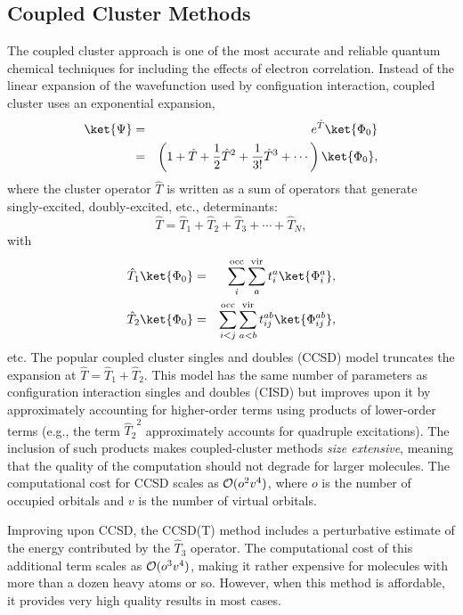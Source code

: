 \subsection{Coupled Cluster Methods} \label{sec:cc}
\renewcommand{\optionname}[2]{\texttt{\nameref{op-#2-#1}}}

The coupled cluster approach is one of the most accurate and reliable quantum
chemical techniques for including the effects of electron correlation.
Instead of the linear expansion of the wavefunction used by configuation
interaction, coupled cluster uses an exponential expansion,
\begin{eqnarray}
\ket{\Psi} &=& e^{\hat{T}} \ket{\Phi_0} \\ \nonumber
           &=& \left( 1 + {\hat{T}} + \frac{1}{2} {\hat{T}}^2
                  + \frac{1}{3!}{\hat{T}}^3 + \cdots \right) \ket{\Phi_0},
\label{eq:CCexpansion}
\end{eqnarray}
where the cluster operator ${\hat{T}}$ is written as a sum of operators that
generate singly-excited, doubly-excited, etc., determinants:
\begin{equation}
{\hat{T}} = {\hat{T}_1} + {\hat{T}_2} + {\hat{T}_3} + \cdots + {\hat{T}_N},
\end{equation}
with
\begin{eqnarray}
{\hat T}_1 \ket{\Phi_0} &=& \sum_{i}^{\rm occ} 
  \sum_a^{\rm vir} t_i^a \ket{\Phi_i^a}, \\
{\hat T}_2 \ket{\Phi_0} &=& \sum_{i<j}^{\rm occ} \sum_{a<b}^{\rm vir} 
  t_{ij}^{ab} \ket{\Phi_{ij}^{ab}}, 
\end{eqnarray}
etc.  The popular coupled cluster singles and doubles (CCSD) model
\cite{Purvis:1982} truncates the expansion at ${\hat{T}} = {\hat{T}_1}
+ {\hat{T}_2}$.  This model has the same number of parameters as
configuration interaction singles and doubles (CISD) but improves upon
it by approximately accounting for higher-order terms using products
of lower-order terms (e.g., the term ${\hat{T}_2}^2$ approximately
accounts for quadruple excitations).  The inclusion of such products
makes coupled-cluster methods {\em size extensive}, meaning that the
quality of the computation should not degrade for larger molecules.
The computational cost for CCSD scales as ${\cal{O}}(o^2 v^4)$, where
$o$ is the number of occupied orbitals and $v$ is the number of virtual
orbitals.

Improving upon CCSD, the CCSD(T) method \cite{Raghavachari:1989} includes
a perturbative estimate of the energy contributed by the ${\hat{T}_3}$
operator.  The computational cost of this additional term scales as
${\cal{O}}(o^3 v^4)$, making it rather expensive for molecules with more than
a dozen heavy atoms or so.  However, when this method is affordable, it
provides very high quality results in most cases.

